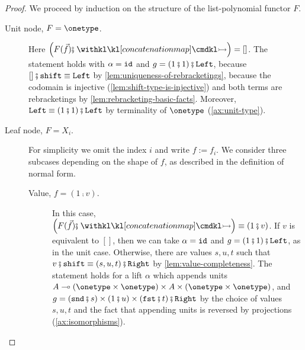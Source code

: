 \begin{proof}  
    We proceed by induction on the structure of the list-polynomial functor $F$.
    \begin{description}
        \item[Unit node, $F = \onetype$.] Here $\left( F(\vec f) \comp \concmap \right) = []$. The statement holds with $\alpha = \mathtt{id}$ and $g = (1\comp1) \comp \leftterm$, because $[] \comp \shiftterm \equiv \leftterm$ by \cref{lem:uniqueness-of-rebracketings}, because the codomain is injective (\cref{lem:shift-type-is-injective}) and both terms are rebracketings by \cref{lem:rebracketing-basic-facts}. Moreover, $\leftterm \equiv (1\comp1) \comp \leftterm$ by terminality of $\onetype$ (\cref{ax:unit-type}).
        
        \item[Leaf node, $F = X_i$.] For simplicity we omit the index $i$ and write $f := f_i$. We consider three subcases depending on the shape of $f$, as described in the definition of normal form.
        
        \begin{description}
            \item[Value, $f = (1 \comp v)$.] In this case, $\left( F(\vec f) \comp \concmap \right) \equiv (1 \comp v)$. If $v$ is equivalent to $[]$, then we can take $\alpha = \mathtt{id}$ and $g = (1 \comp 1) \comp \leftterm$, as in the unit case. Otherwise, there are values $s, u, t$ such that $v \comp \shiftterm \equiv (s, u, t) \comp \rightterm$ by \cref{lem:value-completeness}. The statement holds for a lift $\alpha$ which appends units $A \multimap (\onetype \times \onetype) \times A \times (\onetype \times \onetype)$, and $g = (\sndterm \comp s) \times (1\comp{}u) \times (\fstterm \comp t) \comp \rightterm$ by the choice of values $s, u, t$ and the fact that appending units is reversed by projections (\cref{ax:isomorphisms}).
  

\end{description}
\end{description}
\end{proof}
